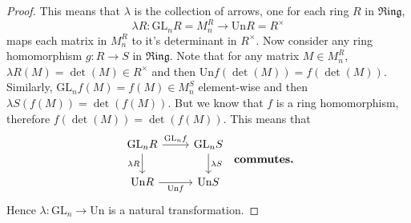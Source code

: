 \documentclass{article}
\theoremstyle{definition}
\theoremstyle{remark}
\theoremstyle{definition}
\theoremstyle{definition}
\theoremstyle{definition}
\newcommand{\cat}[1]{\mathfrak{#1}}
\newcommand{\GL}[1]{\text{GL}_{#1}}
\newcommand{\Un}{\text{Un}}
\begin{document}
\begin{proof}
This means that $ \lambda $ is the collection of arrows, one for each ring $ R $ in $ \cat{Ring} $,
\[\lambda R : \GL{n}R = M_n^{R} \longrightarrow \Un R= R^{\times}\]
maps each matrix in $ M_n^{R} $ to it's determinant in $ R^{\times} $. Now consider any ring homomorphism $ g : R\to S $ in $ \cat{Ring} $. Note that for any matrix $ M\in M_n^{R} $, $ \lambda R(M) = \det(M) \in R^{\times} $ and then $ \Un f(\det(M)) = f(\det(M)) $. Similarly, $ \GL{n}f(M) = f(M) \in M_n^{S} $ element-wise and then $ \lambda S (f(M)) = \det(f(M)) $. But we know that $ f $ is a ring homomorphism, therefore $ f(\det(M)) = \det(f(M)) $. This means that
\[\begin{tikzcd}
	 \GL{n}R \arrow[swap]{d}{\lambda R}\arrow{r}{\GL{n}f} &\GL{n}S\arrow{d}{\lambda S}\\
	 \Un R \arrow[swap]{r}{\Un f} &\Un S
\end{tikzcd}\;\;\text{\textbf{commutes.}}\]
Hence $ \lambda : \GL{n} \longrightarrow \Un $ is a natural transformation.
\end{proof}
\end{document}
